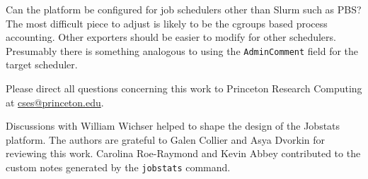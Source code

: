 \documentclass[manuscript]{acmart}
\begin{document}
Can the platform be configured for job schedulers other than Slurm such as PBS? The most difficult piece to adjust is likely to be the cgroups based process accounting. Other exporters should be easier to modify for other schedulers.
Presumably there is something analogous to using the \texttt{AdminComment} field for the target scheduler.

Please direct all questions concerning this work to Princeton Research Computing at \href{mailto:cses@princeton.edu}{cses@princeton.edu}.


\begin{acks}
Discussions with William Wichser helped to shape the design of the Jobstats platform. The authors are grateful to Galen Collier and Asya Dvorkin for reviewing this work. Carolina Roe-Raymond and Kevin Abbey contributed to the custom notes generated by the \texttt{jobstats} command.
\end{acks}





\end{document}
